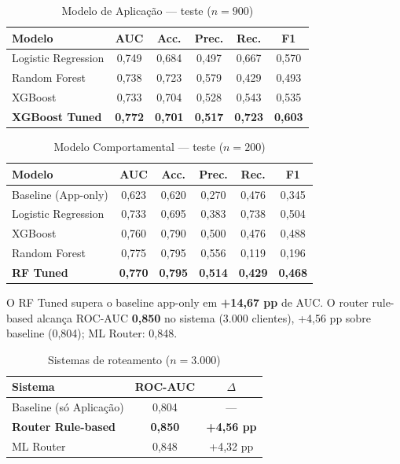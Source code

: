 \documentclass[conference]{IEEEtran}
\begin{document}
\begin{table}[!t]
\caption{Modelo de Aplicação --- teste ($n=900$)}
\label{tab:app}
\centering
\small
\begin{tabular}{lccccc}
\toprule
\textbf{Modelo} & \textbf{AUC} & \textbf{Acc.} & \textbf{Prec.} & \textbf{Rec.} & \textbf{F1} \\
\midrule
Logistic Regression & 0,749 & 0,684 & 0,497 & 0,667 & 0,570 \\
Random Forest & 0,738 & 0,723 & 0,579 & 0,429 & 0,493 \\
XGBoost & 0,733 & 0,704 & 0,528 & 0,543 & 0,535 \\
\textbf{XGBoost Tuned} & \textbf{0,772} & \textbf{0,701} & \textbf{0,517} & \textbf{0,723} & \textbf{0,603} \\
\bottomrule
\end{tabular}
\end{table}

\begin{table}[!t]
\caption{Modelo Comportamental --- teste ($n=200$)}
\label{tab:behav}
\centering
\small
\begin{tabular}{lccccc}
\toprule
\textbf{Modelo} & \textbf{AUC} & \textbf{Acc.} & \textbf{Prec.} & \textbf{Rec.} & \textbf{F1} \\
\midrule
Baseline (App-only) & 0,623 & 0,620 & 0,270 & 0,476 & 0,345 \\
Logistic Regression & 0,733 & 0,695 & 0,383 & 0,738 & 0,504 \\
XGBoost & 0,760 & 0,790 & 0,500 & 0,476 & 0,488 \\
Random Forest & 0,775 & 0,795 & 0,556 & 0,119 & 0,196 \\
\textbf{RF Tuned} & \textbf{0,770} & \textbf{0,795} & \textbf{0,514} & \textbf{0,429} & \textbf{0,468} \\
\bottomrule
\end{tabular}
\end{table}

O RF Tuned supera o baseline app-only em \textbf{+14,67 pp} de AUC. O router rule-based alcança ROC-AUC \textbf{0,850} no sistema (3.000 clientes), +4,56 pp sobre baseline (0,804); ML Router: 0,848.

\begin{table}[!t]
\caption{Sistemas de roteamento ($n=3.000$)}
\label{tab:router}
\centering
\small
\begin{tabular}{lcc}
\toprule
\textbf{Sistema} & \textbf{ROC-AUC} & \textbf{$\Delta$} \\
\midrule
Baseline (só Aplicação) & 0,804 & --- \\
\textbf{Router Rule-based} & \textbf{0,850} & \textbf{+4,56 pp} \\
ML Router & 0,848 & +4,32 pp \\
\bottomrule
\end{tabular}
\end{table}
\end{document}
